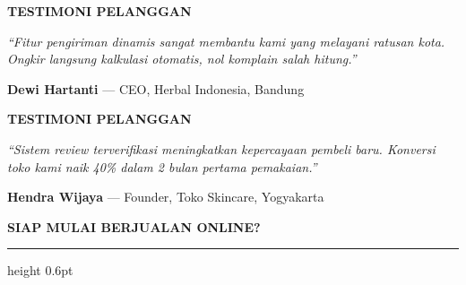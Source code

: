 \documentclass[a4paper]{article}
\newcommand{\sectiontitle}[1]{%
    \vspace{10pt}%
    {\fontsize{13}{16}\selectfont\bfseries\color{BlueDark} #1}\par\vspace{3pt}%
    {\color{BluePrimary}\hrule height 0.6pt}\par\vspace{8pt}%
}
\begin{document}
\noindent
\begin{minipage}[t]{0.485\textwidth}
    \colorbox{EmeraldBg}{%
        \begin{minipage}{\dimexpr\textwidth-14pt}
            \vspace{5pt}
            {\fontsize{10}{13}\selectfont\bfseries\color{EmeraldDark} TESTIMONI PELANGGAN}
            \vspace{5pt}
        \end{minipage}}
    \vspace{6pt}

    {\fontsize{9}{13}\selectfont\color{TextDark}
    \textit{``Fitur pengiriman dinamis sangat membantu kami yang melayani ratusan kota. Ongkir langsung kalkulasi otomatis, nol komplain salah hitung.''}

    \vspace{4pt}
    {\bfseries\color{EmeraldDark} Dewi Hartanti} {\color{TextLight}--- CEO, Herbal Indonesia, Bandung}}
\end{minipage}%
\hfill%
\begin{minipage}[t]{0.485\textwidth}
    \colorbox{EmeraldBg}{%
        \begin{minipage}{\dimexpr\textwidth-14pt}
            \vspace{5pt}
            {\fontsize{10}{13}\selectfont\bfseries\color{EmeraldDark} TESTIMONI PELANGGAN}
            \vspace{5pt}
        \end{minipage}}
    \vspace{6pt}

    {\fontsize{9}{13}\selectfont\color{TextDark}
    \textit{``Sistem review terverifikasi meningkatkan kepercayaan pembeli baru. Konversi toko kami naik 40\% dalam 2 bulan pertama pemakaian.''}

    \vspace{4pt}
    {\bfseries\color{EmeraldDark} Hendra Wijaya} {\color{TextLight}--- Founder, Toko Skincare, Yogyakarta}}
\end{minipage}

\vspace{8pt}

\sectiontitle{SIAP MULAI BERJUALAN ONLINE?}
\end{document}
